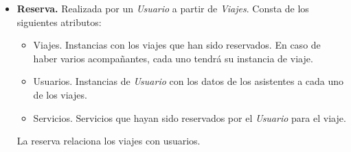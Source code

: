 \begin{itemize}
    \item \textbf{Reserva.} Realizada por un \textit{Usuario} a partir de \textit{Viajes}. Consta de los siguientes atributos:
        \begin{itemize}
            \item Viajes. Instancias con los viajes que han sido reservados. En caso de haber varios acompañantes, cada uno tendrá su
                instancia de viaje.
            \item Usuarios. Instancias de \textit{Usuario} con los datos de los asistentes a cada uno de los viajes.
            \item Servicios. Servicios que hayan sido reservados por el \textit{Usuario} para el viaje.
        \end{itemize}

        La reserva relaciona los viajes con usuarios.

\end{itemize}
